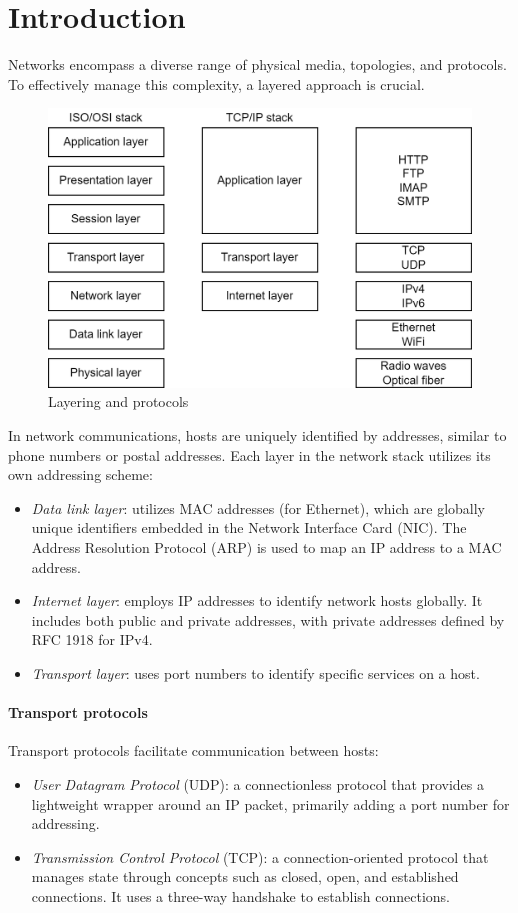 \section{Introduction}

Networks encompass a diverse range of physical media, topologies, and protocols. 
To effectively manage this complexity, a layered approach is crucial.
\begin{figure}[H]
    \centering
    \includegraphics[width=0.75\linewidth]{images/lp.png}
    \caption{Layering and protocols}
\end{figure}

In network communications, hosts are uniquely identified by addresses, similar to phone numbers or postal addresses. 
Each layer in the network stack utilizes its own addressing scheme:
\begin{itemize}
    \item \textit{Data link layer}: utilizes MAC addresses (for Ethernet), which are globally unique identifiers embedded in the Network Interface Card (NIC). 
        The Address Resolution Protocol (ARP) is used to map an IP address to a MAC address.
    \item \textit{Internet layer}: employs IP addresses to identify network hosts globally. 
        It includes both public and private addresses, with private addresses defined by RFC 1918 for IPv4.
    \item \textit{Transport layer}: uses port numbers to identify specific services on a host.
\end{itemize}

\paragraph*{Transport protocols}
Transport protocols facilitate communication between hosts:
\begin{itemize}
    \item \textit{User Datagram Protocol} (UDP): a connectionless protocol that provides a lightweight wrapper around an IP packet, primarily adding a port number for addressing.
    \item \textit{Transmission Control Protocol} (TCP): a connection-oriented protocol that manages state through concepts such as closed, open, and established connections. 
        It uses a three-way handshake to establish connections.
\end{itemize}

